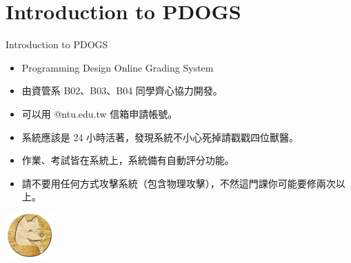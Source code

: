 \documentclass[t]{beamer}
\begin{document}
\section{Introduction to PDOGS}
\begin{frame}{Introduction to PDOGS}
  \begin{itemize}
    \item Programming Design Online Grading System
    \item 由資管系 B02、B03、B04 同學齊心協力開發。
    \item 可以用 @ntu.edu.tw 信箱申請帳號。
    \item 系統應該是 24 小時活著，發現系統不小心死掉請戳戳四位獸醫。
    \item 作業、考試皆在系統上，系統備有自動評分功能。
    \item 請不要用任何方式攻擊系統（包含物理攻擊），不然這門課你可能要修兩次以上。
  \end{itemize}
  \begin{center}
    \includegraphics[width=5em]{pdogs.png}
  \end{center}
\end{frame}

\end{document}
